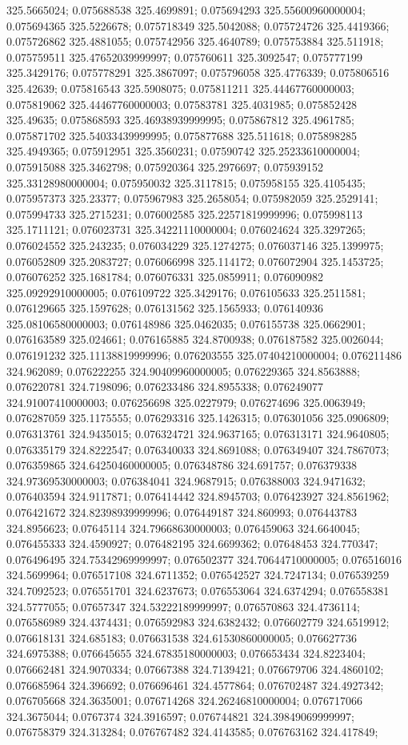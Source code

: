 325.5665024; 0.075688538 325.4699891; 0.075694293 325.55600960000004; 0.075694365 325.5226678; 0.075718349 325.5042088; 0.075724726 325.4419366; 0.075726862 325.4881055; 0.075742956 325.4640789; 0.075753884 325.511918; 0.075759511 325.47652039999997; 0.075760611 325.3092547; 0.075777199 325.3429176; 0.075778291 325.3867097; 0.075796058 325.4776339; 0.075806516 325.42639; 0.075816543 325.5908075; 0.075811211 325.44467760000003; 0.075819062 325.44467760000003; 0.07583781 325.4031985; 0.075852428 325.49635; 0.075868593 325.46938939999995; 0.075867812 325.4961785; 0.075871702 325.54033439999995; 0.075877688 325.511618; 0.075898285 325.4949365; 0.075912951 325.3560231; 0.07590742 325.25233610000004; 0.075915088 325.3462798; 0.075920364 325.2976697; 0.075939152 325.33128980000004; 0.075950032 325.3117815; 0.075958155 325.4105435; 0.075957373 325.23377; 0.075967983 325.2658054; 0.075982059 325.2529141; 0.075994733 325.2715231; 0.076002585 325.22571819999996; 0.075998113 325.1711121; 0.076023731 325.34221110000004; 0.076024624 325.3297265; 0.076024552 325.243235; 0.076034229 325.1274275; 0.076037146 325.1399975; 0.076052809 325.2083727; 0.076066998 325.114172; 0.076072904 325.1453725; 0.076076252 325.1681784; 0.076076331 325.0859911; 0.076090982 325.09292910000005; 0.076109722 325.3429176; 0.076105633 325.2511581; 0.076129665 325.1597628; 0.076131562 325.1565933; 0.076140936 325.08106580000003; 0.076148986 325.0462035; 0.076155738 325.0662901; 0.076163589 325.024661; 0.076165885 324.8700938; 0.076187582 325.0026044; 0.076191232 325.11138819999996; 0.076203555 325.07404210000004; 0.076211486 324.962089; 0.076222255 324.90409960000005; 0.076229365 324.8563888; 0.076220781 324.7198096; 0.076233486 324.8955338; 0.076249077 324.91007410000003; 0.076256698 325.0227979; 0.076274696 325.0063949; 0.076287059 325.1175555; 0.076293316 325.1426315; 0.076301056 325.0906809; 0.076313761 324.9435015; 0.076324721 324.9637165; 0.076313171 324.9640805; 0.076335179 324.8222547; 0.076340033 324.8691088; 0.076349407 324.7867073; 0.076359865 324.64250460000005; 0.076348786 324.691757; 0.076379338 324.97369530000003; 0.076384041 324.9687915; 0.076388003 324.9471632; 0.076403594 324.9117871; 0.076414442 324.8945703; 0.076423927 324.8561962; 0.076421672 324.82398939999996; 0.076449187 324.860993; 0.076443783 324.8956623; 0.07645114 324.79668630000003; 0.076459063 324.6640045; 0.076455333 324.4590927; 0.076482195 324.6699362; 0.07648453 324.770347; 0.076496495 324.75342969999997; 0.076502377 324.70644710000005; 0.076516016 324.5699964; 0.076517108 324.6711352; 0.076542527 324.7247134; 0.076539259 324.7092523; 0.076551701 324.6237673; 0.076553064 324.6374294; 0.076558381 324.5777055; 0.07657347 324.53222189999997; 0.076570863 324.4736114; 0.076586989 324.4374431; 0.076592983 324.6382432; 0.076602779 324.6519912; 0.076618131 324.685183; 0.076631538 324.61530860000005; 0.076627736 324.6975388; 0.076645655 324.67835180000003; 0.076653434 324.8223404; 0.076662481 324.9070334; 0.07667388 324.7139421; 0.076679706 324.4860102; 0.076685964 324.396692; 0.076696461 324.4577864; 0.076702487 324.4927342; 0.076705668 324.3635001; 0.076714268 324.26246810000004; 0.076717066 324.3675044; 0.0767374 324.3916597; 0.076744821 324.39849069999997; 0.076758379 324.313284; 0.076767482 324.4143585; 0.076763162 324.417849; 